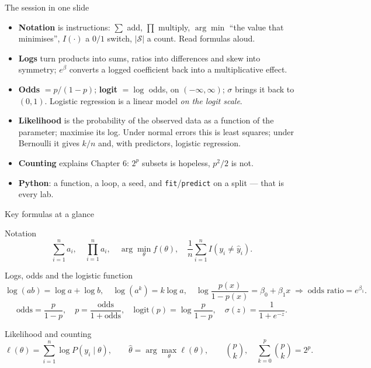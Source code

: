 \documentclass[aspectratio=169,11pt]{beamer}
\begin{document}
\begin{frame}{The session in one slide}
  \footnotesize
  \begin{itemize}
    \item \textbf{Notation} is instructions: $\sum$ add, $\prod$ multiply,
          $\arg\min$ ``the value that minimises'', $I(\cdot)$ a $0/1$ switch,
          $|\mathcal{S}|$ a count. Read formulas aloud.
    \item \textbf{Logs} turn products into sums, ratios into differences and
          skew into symmetry; $e^{\beta}$ converts a logged coefficient back
          into a multiplicative effect.
    \item \textbf{Odds} $= p/(1-p)$; \textbf{logit} $= \log$ odds, on
          $(-\infty,\infty)$; $\sigma$ brings it back to $(0,1)$. Logistic
          regression is a linear model \emph{on the logit scale}.
    \item \textbf{Likelihood} is the probability of the observed data as a
          function of the parameter; maximise its log. Under normal errors this
          is least squares; under Bernoulli it gives $k/n$ and, with
          predictors, logistic regression.
    \item \textbf{Counting} explains Chapter 6: $2^p$ subsets is hopeless,
          $p^2/2$ is not.
    \item \textbf{Python}: a function, a loop, a seed, and
          \texttt{fit}/\texttt{predict} on a split --- that is every lab.
  \end{itemize}
\end{frame}

\begin{frame}{Key formulas at a glance}
  \footnotesize
  \begin{block}{Notation}
    \[
      \sum_{i=1}^{n} a_i, \quad \prod_{i=1}^{n} a_i, \quad
      \arg\min_\theta f(\theta), \quad
      \frac{1}{n}\sum_{i=1}^n I(y_i \ne \hat y_i) .
    \]
  \end{block}
  \begin{block}{Logs, odds and the logistic function}
    \[
      \log(ab) = \log a + \log b, \quad \log(a^k) = k \log a, \quad
      \log\frac{p(x)}{1-p(x)} = \beta_0 + \beta_1 x
      \;\Longrightarrow\;
      \text{odds ratio} = e^{\beta_1} .
    \]
    \[
      \mathrm{odds} = \frac{p}{1-p}, \quad
      p = \frac{\mathrm{odds}}{1+\mathrm{odds}}, \quad
      \mathrm{logit}(p) = \log\frac{p}{1-p}, \quad
      \sigma(z) = \frac{1}{1+e^{-z}} .
    \]
  \end{block}
  \begin{block}{Likelihood and counting}
    \[
      \ell(\theta) = \sum_{i=1}^{n}\log P(y_i \mid \theta),
      \qquad
      \hat\theta = \arg\max_\theta \ell(\theta),
      \qquad
      \binom{p}{k}, \quad \sum_{k=0}^p \binom{p}{k} = 2^p .
    \]
  \end{block}
\end{frame}
\end{document}
